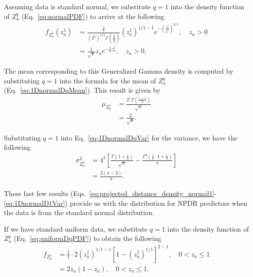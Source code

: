 \documentclass[aos]{imsart}
\begin{document}
Assuming data is standard normal, we substitute $q=1$ into the density function of $Z^q_a$ (Eq.~\ref{eq:normalPDF}) to arrive at the following
%
\begin{equation}\label{eq:projected_distance_density_normal1}
\begin{aligned}
f_{Z^1_a}\left(z^1_a\right) &= \frac{\frac{2}{1}}{\left(2^1\right)^{1/1}\Gamma\left(\frac{\frac{1}{1}}{\frac{2}{1}}\right)}\left(z^1_a\right)^{1/1 - 1} e^{-\left(\frac{z^1_a}{2^1}\right)^{2/1}}, \quad z_a > 0\\
&= \frac{1}{\sqrt{\pi}} z_a e^{-\frac{1}{4}z^2_a}, \quad z_a > 0.
\end{aligned}
\end{equation}

The mean corresponding to this Generalized Gamma density is computed by substituting $q=1$ into the formula for the mean of $Z^q_a$ (Eq.~\ref{eq:1DnormalDqMean}). This result is given by
%
\begin{equation}\label{eq:1DnormalD1Mean}
\begin{aligned}
\mu_{Z^1_a} &= \frac{2^1 \Gamma\left(\frac{1 + 1}{2}\right)}{\sqrt{\pi}} \\
&= \frac{2}{\sqrt{\pi}}.
\end{aligned}
\end{equation}

Substituting $q=1$ into Eq.~\ref{eq:1DnormalDqVar} for the variance, we have the following
%
\begin{equation}\label{eq:1DnormalD1Var}
\begin{aligned}
\sigma^2_{Z^1_a} &= 4^1\left[\frac{\Gamma\left(1 + \frac{1}{2}\right)}{\sqrt{\pi}} - \frac{\Gamma^2\left(\frac{1}{2}\cdot 1 + \frac{1}{2}\right)}{\pi}\right] \\
&= \frac{2(\pi-2)}{\pi}.
\end{aligned}
\end{equation}

These last few results (Eqs.~\ref{eq:projected_distance_density_normal1}-\ref{eq:1DnormalD1Var}) provide us with the distribution for NPDR predictors when the data is from the standard normal distribution. 

If we have standard uniform data, we substitute $q=1$ into the density function of $Z^q_a$ (Eq.~\ref{eq:uniformDqPDF}) to obtain the following
%
\begin{equation}\label{eq:projected_distance_density_uniform1}
\begin{aligned}
f_{Z^1_a} &= \frac{1}{1}\cdot 2\left(z^1_a\right)^{1/1 - 1}\left[1 - \left(z^1_a\right)^{1/1}\right]^{2-1}, \quad 0 < z_a \leq 1 \\
&= 2z_a(1 - z_a), \quad 0 < z_a \leq 1.
\end{aligned}
\end{equation}
\end{document}
